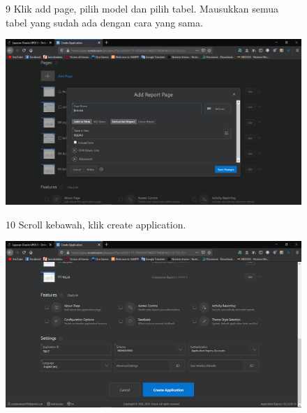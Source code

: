 \begin{enumerate}
\begin{figure}[!htbp]
\item[9] Klik add page, pilih model dan pilih tabel. Mausukkan semua tabel yang sudah ada dengan cara yang sama.
\begin{center}
    \includegraphics[scale=0.3]{figures/Screenshot(58).png}
    \end{center}
    \end{figure}
    
\begin{figure}[!htbp]
\item[10] Scroll kebawah, klik create application.
\begin{center}
    \includegraphics[scale=0.3]{figures/Screenshot(60).png}
    \end{center}
    \end{figure}
    

\end{enumerate}
